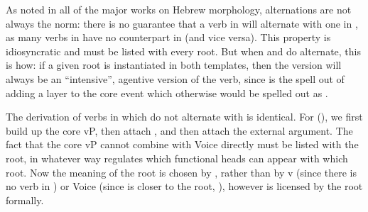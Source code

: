 \begin{exe}
\begin{xlist}
\begin{exe}
\begin{xlist}
\begin{exe}
\begin{xlist}
\begin{exe}
\begin{exe}
\begin{xlist}
\begin{exe}
\begin{xlist}
\begin{exe}
\begin{xlist}
\begin{exe}
\begin{xlist}
\begin{exe}
\begin{xlist}
\begin{exe}
\begin{xlist}
\begin{exe}
\begin{xlist}
\begin{exe}
\begin{xlist}
\begin{exe}
\begin{xlist}
\begin{exe}
\begin{xlist}
\begin{exe}
\begin{xlist}
\begin{exe}
\begin{xlist}
\begin{exe}
\begin{exe}
\begin{xlist}
\begin{exe}
\begin{xlist}
\begin{exe}
\begin{xlist}
\begin{exe}
\begin{xlist}
{\begin{exe}
\begin{xlist}
\begin{exe}
\begin{xlist}
\begin{exe}
\begin{xlist}
\begin{exe}
\begin{xlist}
\begin{xlist}
\begin{xlist}
\begin{exe}
\begin{xlist}
\begin{xlist}
\begin{xlist}
\begin{exe}
\begin{exe}
\begin{xlist}
\begin{exe}
\begin{xlist}
\begin{exe}
\begin{xlist}
\begin{exe}
\begin{xlist}
\begin{exe}
\begin{xlist}
\begin{exe}
\begin{xlist}
\begin{exe}
\begin{exe}
\begin{xlist}
\begin{xlist}
\begin{exe}
\begin{xlist}
\begin{exe}
\begin{xlist}
\begin{exe}
\begin{xlist}
\begin{exe}
\begin{xlist}
\begin{exe}
\begin{xlist}
\begin{exe}
\begin{xlist}
\begin{exe}
\begin{exe}
\begin{xlist}
As noted in all of the major works on Hebrew morphology, alternations are not always the norm: there is no guarantee that a verb in {\tkal} will alternate with one in {\tpie}, as many verbs in {\tkal} have no counterpart in {\tkal} (and vice versa). This property is idiosyncratic and must be listed with every root. But when {\tkal} and {\tpie} do alternate, this is how: if a given root is instantiated in both templates, then the {\tpie} version will always be an ``intensive'', agentive version of the {\tkal} verb, since {\tpie} is the spell out of adding a {\va} layer to the core event which otherwise would be spelled out as {\tkal}. 

The derivation of verbs in {\tpie} which do not alternate with {\tkal} is identical. For (\nextx), we first build up the core vP, then attach {\va}, and then attach the external argument. The fact that the core vP cannot combine with Voice directly must be listed with the root, in whatever way regulates which functional heads can appear with which root. Now the meaning of the root is chosen by {\va}, rather than by v (since there is no verb in {\tkal}) or Voice (since {\va} is closer to the root, \citealt{arad03,marantz13,elenasamioti14}), however {\va} is licensed by the root formally.

\end{xlist}
\end{exe}
\end{exe}
\end{xlist}
\end{exe}
\end{xlist}
\end{exe}
\end{xlist}
\end{exe}
\end{xlist}
\end{exe}
\end{xlist}
\end{exe}
\end{xlist}
\end{exe}
\end{xlist}
\end{xlist}
\end{exe}
\end{exe}
\end{xlist}
\end{exe}
\end{xlist}
\end{exe}
\end{xlist}
\end{exe}
\end{xlist}
\end{exe}
\end{xlist}
\end{exe}
\end{xlist}
\end{exe}
\end{exe}
\end{xlist}
\end{xlist}
\end{xlist}
\end{exe}
\end{xlist}
\end{xlist}
\end{xlist}
\end{exe}
\end{xlist}
\end{exe}
\end{xlist}
\end{exe}
\end{xlist}
\end{exe}}
\end{xlist}
\end{exe}
\end{xlist}
\end{exe}
\end{xlist}
\end{exe}
\end{xlist}
\end{exe}
\end{exe}
\end{xlist}
\end{exe}
\end{xlist}
\end{exe}
\end{xlist}
\end{exe}
\end{xlist}
\end{exe}
\end{xlist}
\end{exe}
\end{xlist}
\end{exe}
\end{xlist}
\end{exe}
\end{xlist}
\end{exe}
\end{xlist}
\end{exe}
\end{xlist}
\end{exe}
\end{xlist}
\end{exe}
\end{xlist}
\end{exe}
\end{exe}
\end{xlist}
\end{exe}
\end{xlist}
\end{exe}
\end{xlist}
\end{exe}
